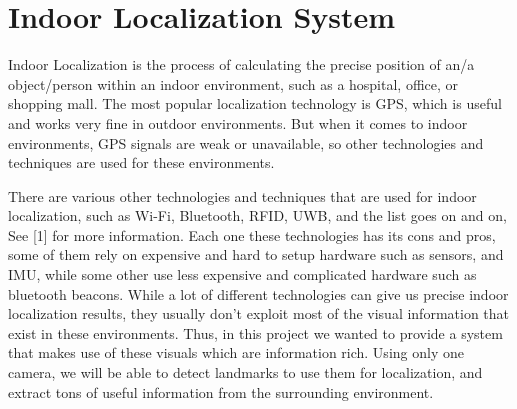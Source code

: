 \section{Indoor Localization System}

Indoor Localization is the process of calculating the precise position of an/a object/person within an indoor environment, such as a hospital, office, or shopping mall. The most popular localization technology is GPS, which is useful and works very fine in outdoor environments. But when it comes to indoor environments, GPS signals are weak or unavailable, so other technologies and techniques are used for these environments.

There are various other technologies and techniques that are used for indoor localization, such as Wi-Fi, Bluetooth, RFID, UWB, and the list goes on and on, See [1] for more information. Each one these technologies has its cons and pros, some of them rely on expensive and hard to setup hardware such as sensors, and IMU, while some other use less expensive and complicated hardware such as bluetooth beacons. While a lot of different technologies can give us precise indoor localization results, they usually don't exploit most of the visual information that exist in these environments. Thus, in this project we wanted to provide a system that makes use of these visuals which are information rich. Using only one camera, we will be able to detect landmarks to use them for localization, and extract tons of useful information from the surrounding environment.